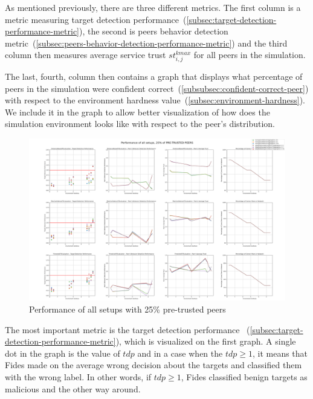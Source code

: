 As mentioned previously, there are three different metrics.
The first column is a metric measuring target detection performance~(\ref{subsec:target-detection-performance-metric}), the second is peers behavior detection metric~(\ref{subsec:peers-behavior-detection-performance-metric}) and the third column then measures average service trust $st^{kmax}_{i, j}$ for all peers in the simulation.

The last, fourth, column then contains a graph that displays what percentage of peers in the simulation were confident correct~(\ref{subsubsec:confident-correct-peer}) with respect to the environment hardness value~(\ref{subsec:environment-hardness}).
We include it in the graph to allow better visualization of how does the simulation environment looks like with respect to the peer's distribution.

\begin{figure}[hp!]
    \centering
    \includegraphics[width=0.94\paperwidth, angle=90]{assets/25_all_metrics.png}
    \caption{Performance of all setups with 25\% pre-trusted peers}
    \label{fig:performance-all-setups-25-pretrusted}
\end{figure}

The most important metric is the target detection performance ~(\ref{subsec:target-detection-performance-metric}), which is visualized on the first graph.
A single dot in the graph is the value of $tdp$ and in a case when the $tdp \geq 1$, it means that Fides made on the average wrong decision about the targets and classified them with the wrong label.
In other words, if $tdp \geq 1$, Fides classified benign targets as malicious and the other way around.

